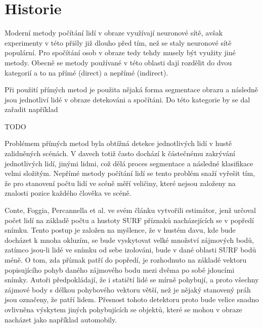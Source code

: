\chapter{Historie}
\label{sec:History}
Moderní metody počítání lidí v obraze využívají neuronové sítě, avšak experimenty v této přišly již dlouho před tím, než se staly neuronové sítě populární.
Pro spočítání osob v obraze tedy tehdy musely být využity jiné metody.
Obecně se metody používané v této oblasti dají rozdělit do dvou kategorií a to na přímé (direct) a nepřímé (indirect). \cite{crowd_on_pets}

Při použití přímých metod je použita nějaká forma segmentace obrazu a následně jsou jednotliví lidé v obraze detekováni a spočítáni. Do této kategorie by se dal zařadit například 

 TODO

Problémem přímých metod byla obtížná detekce jednotlivých lidí v hustě zalidněných scénách.
V davech totiž často dochází k částečnému zakrývání jednotlivých lidí, jinými lidmi, což dělá proces segmentace a následné klasifikace velmi složitým.
Nepřímé metody počítání lidí se tento problém snaží vyřešit tím, že pro stanovení počtu lidí ve scéně 
měří veličiny, které nejsou založeny na znalosti pozice každého člověka ve scéně.

Conte, Foggia, Percannella et al. ve svém článku \cite{crowd_on_pets} vytvořili estimátor, jenž určoval počet lidí na základě počtu a hustoty SURF příznaků nacházejících se v popředí snímku.
Tento postup je založen na myšlence, že v hustém davu, kde bude docházet k mnoha okluzím, se bude vyskytovat velké množství zájmových bodů, zatímco jsou-li lidé ve snímku od sebe izolováni, bude v dané oblasti SURF bodů méně.
O tom, zda příznak patří do popředí, je rozhodnuto na základě vektoru popisujícího pohyb daného zájmového bodu mezi dvěma po sobě jdoucími snímky.
Autoři předpokládají, že i statičtí lidé se mírně pohybují, a proto všechny zájmové body s délkou pohybového vektoru větší, než je nějaký stanovený práh jsou označeny, že patří lidem.
Přesnost tohoto detektoru proto bude velice snadno ovlivněna výskytem jiných pohybujících se objektů, které se mohou v obraze nacházet jako například automobily.






\endinput